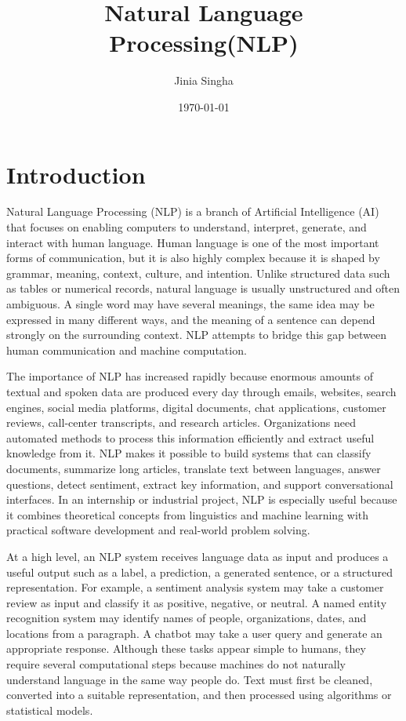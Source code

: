 \documentclass[11pt]{article}
\title{Natural Language Processing(NLP)}
\author{Jinia Singha}
\date{\today}
\begin{document}
\maketitle

\section{Introduction}

Natural Language Processing (NLP) is a branch of Artificial Intelligence (AI) that focuses on enabling computers to understand, interpret, generate, and interact with human language. Human language is one of the most important forms of communication, but it is also highly complex because it is shaped by grammar, meaning, context, culture, and intention. Unlike structured data such as tables or numerical records, natural language is usually unstructured and often ambiguous. A single word may have several meanings, the same idea may be expressed in many different ways, and the meaning of a sentence can depend strongly on the surrounding context. NLP attempts to bridge this gap between human communication and machine computation.

The importance of NLP has increased rapidly because enormous amounts of textual and spoken data are produced every day through emails, websites, search engines, social media platforms, digital documents, chat applications, customer reviews, call-center transcripts, and research articles. Organizations need automated methods to process this information efficiently and extract useful knowledge from it. NLP makes it possible to build systems that can classify documents, summarize long articles, translate text between languages, answer questions, detect sentiment, extract key information, and support conversational interfaces. In an internship or industrial project, NLP is especially useful because it combines theoretical concepts from linguistics and machine learning with practical software development and real-world problem solving.

At a high level, an NLP system receives language data as input and produces a useful output such as a label, a prediction, a generated sentence, or a structured representation. For example, a sentiment analysis system may take a customer review as input and classify it as positive, negative, or neutral. A named entity recognition system may identify names of people, organizations, dates, and locations from a paragraph. A chatbot may take a user query and generate an appropriate response. Although these tasks appear simple to humans, they require several computational steps because machines do not naturally understand language in the same way people do. Text must first be cleaned, converted into a suitable representation, and then processed using algorithms or statistical models.
\end{document}

